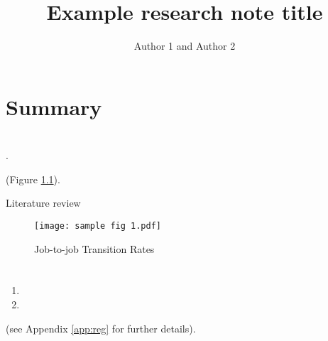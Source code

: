 \documentclass[11pt,twocolumn,openany,leqno]{e61-research-note}
\begin{document}
\emergencystretch=5pt
\baselineskip=15pt
\sloppy

\title{Example research note title}


\author{Author 1 and Author 2}

\maketitle

\chapter*{Summary}

\begin{abstract}

\lipsum[1-2]

\end{abstract}

\chapter{\lipsum[][1]}

\lipsum[1] \parencite{Adams22}.

\lipsum[2] (Figure \ref{fig:j2j-agg}). 

\newpage

\begin{Boxx}[label=b1]{Literature review}
\begin{small}
\setlength{\parindent}{15pt}
\lipsum[3-4]
\end{small}
\end{Boxx}

\begin{figure}[htb]
\caption{Job-to-job Transition Rates}\label{fig:j2j-agg}
\texttt{[image: sample fig 1.pdf]}
\end{figure}

\chapter{\lipsum[][2]}

\lipsum[][1]
\begin{enumerate}
  \item \lipsum[][4]
  \item \lipsum[][5]
\end{enumerate}

\lipsum[1] (see Appendix \ref{app:reg} for further details).
\end{document}
